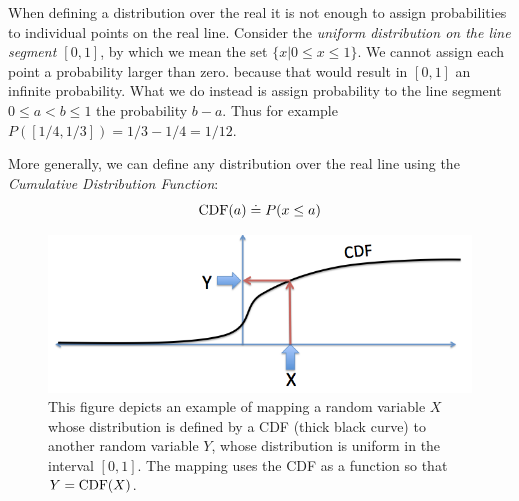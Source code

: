 When defining a distribution over the real it is not enough to assign
probabilities to individual points on the real line. Consider the {\em
  uniform distribution on the line segment $[0,1]$}, by which
we mean the set $\{x | 0 \leq x \leq 1\}$. We cannot assign each
point a probability larger than zero. because that would result in
$[0,1]$ an infinite probability. What we do instead is assign
probability to the line segment $0 \leq a < b \leq 1$ the probability
$b-a$. Thus for example $P([1/4,1/3])=1/3-1/4 = 1/12$.

More generally, we can define any distribution over the real line
using the {\em Cumulative Distribution Function}:
\[
\mbox{CDF}(a) \doteq P(x \leq a)
\]

\begin{figure}[th]
\begin{center}
\includegraphics[width=5in]{figs/CDFmapping.png}
\end{center}
\caption{This figure depicts an example of mapping a random variable
  $X$ whose distribution is defined by a CDF (thick black curve) to
  another random variable $Y$, whose distribution is uniform in the
  interval $[0,1]$. The mapping uses the CDF as a function so that
  $Y=\mbox{CDF}(X)$. \label{fig:CDFmap}}
\end{figure}

